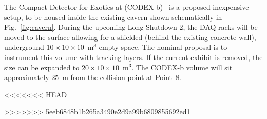 The Compact Detector for Exotics at \lhcb (CODEX-b)~\cite{Gligorov:2017nwh} is a proposed inexpensive setup, to be housed inside the existing \lhcb cavern shown schematically in Fig.~\ref{fig:cavern}. During the upcoming Long Shutdown 2, the DAQ racks will be moved to the surface allowing for a shielded (behind the existing concrete wall), underground $10\times10\times10$~m$^3$ empty space. The nominal proposal is to instrument this volume with tracking layers. If the current \delphi exhibit is removed, the size can be expanded to $20\times 10 \times 10$~m$^3$. The CODEX-b volume will sit approximately 25~m from the collision point at Point~8. 

<<<<<<< HEAD
=======



>>>>>>> 5eeb6848b1b265a3490e2d9a99b6809855692ed1
